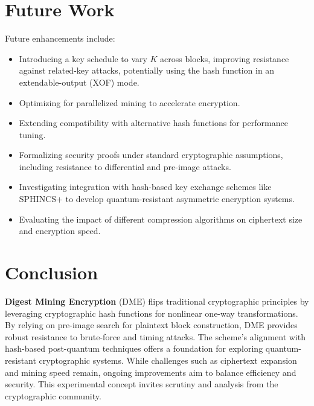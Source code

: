 \documentclass[11pt,a4paper]{article}
\begin{document}
\section*{Future Work}
Future enhancements include:
\begin{itemize}
  \item Introducing a key schedule to vary \( K \) across blocks, improving resistance against related-key attacks, potentially using the hash function in an extendable-output (XOF) mode.
  \item Optimizing for parallelized mining to accelerate encryption.
  \item Extending compatibility with alternative hash functions for performance tuning.
  \item Formalizing security proofs under standard cryptographic assumptions, including resistance to differential and pre-image attacks.
  \item Investigating integration with hash-based key exchange schemes like SPHINCS+ to develop quantum-resistant asymmetric encryption systems.
  \item Evaluating the impact of different compression algorithms on ciphertext size and encryption speed.
\end{itemize}

\section*{Conclusion}
\textbf{Digest Mining Encryption} (DME) flips traditional cryptographic principles by leveraging cryptographic hash functions for nonlinear one-way transformations. By relying on pre-image search for plaintext block construction, DME provides robust resistance to brute-force and timing attacks. The scheme’s alignment with hash-based post-quantum techniques offers a foundation for exploring quantum-resistant cryptographic systems. While challenges such as ciphertext expansion and mining speed remain, ongoing improvements aim to balance efficiency and security. This experimental concept invites scrutiny and analysis from the cryptographic community.
\end{document}
